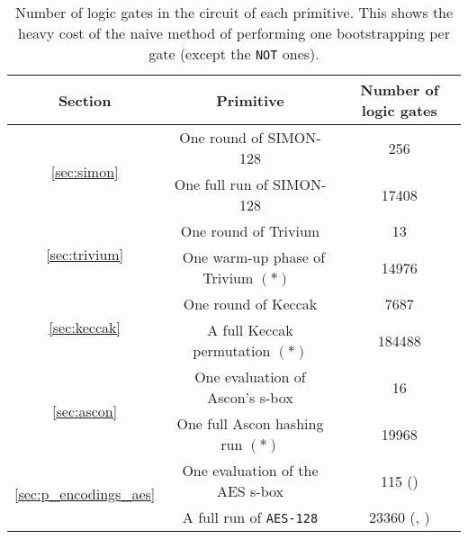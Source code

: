 \begin{table}
    \centering
    \begin{tabular}{|c|c|c|}
        \hline
        \textbf{Section} & \textbf{Primitive} & \textbf{Number of logic gates}  \\
        \hline
        \multirow{2}{*}{\ref{sec:simon}} & One round of SIMON-128 & 256\\
        \cline{2-3}
        & One full run of SIMON-128 & 17408\\
        \hline
        \multirow{2}{*}{\ref{sec:trivium}} & One round of Trivium & 13\\
        \cline{2-3}
        & ~One warm-up phase of Trivium $(*)$~ & 14976\\
        \hline
        \multirow{2}{*}{\ref{sec:keccak}} & One round of Keccak & 7687\\
        \cline{2-3}
        & A full Keccak permutation $(*)$ & 184488\\
        \hline
      \multirow{2}{*}{ \ref{sec:ascon}} & One evaluation of Ascon's s-box & 16\\
      \cline{2-3}
      & One full Ascon hashing run $(*)$ & 19968\\
        \hline
        \multirow{2}{*}{\ref{sec:p_encodings_aes}} & One evaluation of the AES s-box & 115 (\cite{boyar})\\
        \cline{2-3}
        & A full run of \texttt{AES-128}  & 23360 (\cite{boyar}, \cite{EPRINT:Maximov19})\\
        \hline
    \end{tabular}
    \medskip
    \caption{Number of logic gates in the circuit of each primitive. This shows the heavy cost of the naive method of performing one bootstrapping per gate (except the \texttt{NOT} ones).}
    \label{tab:gates}
\end{table}


